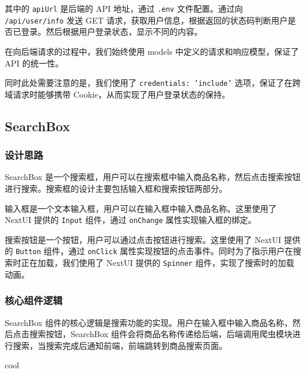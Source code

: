 其中的 \texttt{apiUrl} 是后端的 API 地址，通过 \texttt{.env} 文件配置。通过向 \texttt{/api/user/info} 发送 GET 请求，获取用户信息，根据返回的状态码判断用户是否已登录。然后根据用户登录状态，显示不同的内容。

在向后端请求的过程中，我们始终使用 models 中定义的请求和响应模型，保证了 API 的统一性。

同时此处需要注意的是，我们使用了 \texttt{credentials: 'include'} 选项，保证了在跨域请求时能够携带 Cookie，从而实现了用户登录状态的保持。

\subsection{SearchBox}

\subsubsection{设计思路}

SearchBox 是一个搜索框，用户可以在搜索框中输入商品名称，然后点击搜索按钮进行搜索。搜索框的设计主要包括输入框和搜索按钮两部分。

输入框是一个文本输入框，用户可以在输入框中输入商品名称。这里使用了 NextUI 提供的 \texttt{Input} 组件，通过 \texttt{onChange} 属性实现输入框的绑定。

搜索按钮是一个按钮，用户可以通过点击按钮进行搜索。这里使用了 NextUI 提供的 \texttt{Button} 组件，通过 \texttt{onClick} 属性实现按钮的点击事件。同时为了指示用户在搜索时正在加载，我们使用了 NextUI 提供的 \texttt{Spinner} 组件，实现了搜索时的加载动画。

\subsubsection{核心组件逻辑}

SearchBox 组件的核心逻辑是搜索功能的实现。用户在输入框中输入商品名称，然后点击搜索按钮，SearchBox 组件会将商品名称传递给后端，后端调用爬虫模块进行搜索，当搜索完成后通知前端，前端跳转到商品搜索页面。

\begin{codebox}{}{cool}
\end{codebox}

